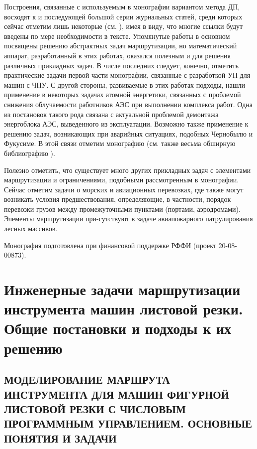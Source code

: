 \documentclass[11pt,twoside]{report}
\begin{document}
Построения, связанные с используемым в монографии
вариантом метода ДП, восходят к
\cite{Cha1`} и последующей большой серии
журнальных статей,
среди которых сейчас отметим лишь некоторые
(см. \cite{Cha8`,intro51,intro52,intro53,intro54,intro55,intro56}),
имея в виду, что многие ссылки будут
введены по мере необходимости в тексте.
Упомянутые работы
\cite{Cha8`,intro51,intro52,intro53,intro54,intro55,intro56}
в основном посвящены решению абстрактных задач маршрутизации,
но математический аппарат, разработанный в этих работах,
оказался полезным и для решения различных прикладных задач.
В числе последних следует, конечно,
отметить практические задачи первой части монографии,
связанные с разработкой УП для машин с ЧПУ.
С другой стороны, развиваемые в этих работах подходы,
нашли применение в некоторых задачах атомной энергетики,
связанных с проблемой снижения облучаемости работников АЭС
при выполнении комплекса работ.
Одна из постановок такого рода связана с
актуальной проблемой демонтажа энергоблока АЭС,
выведенного из эксплуатации.
Возможно также применение к решению задач,
возникающих при аварийных ситуациях,
подобных Чернобылю и Фукусиме.
В этой связи отметим монографию \cite{Cha2`}
(см. также весьма обширную библиографию \cite{Cha2`}).

Полезно отметить, что существует много других прикладных задач
с элементами маршрутизации и ограничениями,
подобными рассмотренным в монографии.
Сейчас отметим задачи о морских и авиационных перевозках,
где также могут возникать условия предшествования,
определяющие, в частности, порядок перевозки грузов
между промежуточными пунктами (портами, аэродромами).
Элементы маршрутизации при-сутствуют в задаче
авиапожарного патрулирования лесных массивов.

Монография подготовлена при финансовой поддержке
РФФИ (проект 20-08-00873).


\part{Инженерные задачи
маршрутизации инструмента машин листовой резки.
Общие постановки и подходы к их решению}

\chapter{МОДЕЛИРОВАНИЕ МАРШРУТА ИНСТРУМЕНТА ДЛЯ МАШИН ФИГУРНОЙ ЛИСТОВОЙ РЕЗКИ С
ЧИСЛОВЫМ ПРОГРАММНЫМ УПРАВЛЕНИЕМ.
ОСНОВНЫЕ ПОНЯТИЯ И ЗАДАЧИ}
\setcounter{chapter}{1}
\setcounter{equation}{0}
\end{document}
